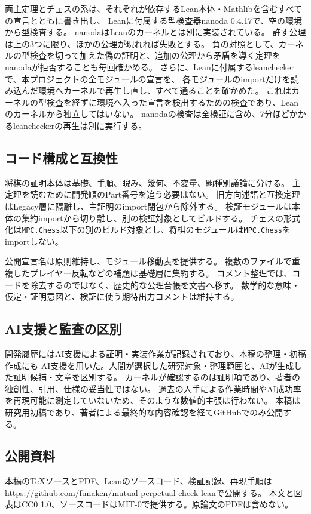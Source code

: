 \documentclass[a4paper,11pt]{article}
\newcommand{\code}[1]{{\small\nolinkurl{#1}}}
\theoremstyle{definition}
\begin{document}
両主定理とチェスの系は、それぞれが依存するLean本体・Mathlibを含むすべての宣言とともに書き出し、
Leanに付属する型検査器nanoda 0.4.17で、空の環境から型検査する。
nanodaはLeanのカーネルとは別に実装されている。
許す公理は上の3つに限り、ほかの公理が現れれば失敗とする。
負の対照として、カーネルの型検査を切って加えた偽の証明と、追加の公理から矛盾を導く定理を
nanodaが拒否することも毎回確かめる。
さらに、Leanに付属するleancheckerで、本プロジェクトの全モジュールの宣言を、
各モジュールのimportだけを読み込んだ環境へカーネルで再生し直し、すべて通ることを確かめた。
これはカーネルの型検査を経ずに環境へ入った宣言を検出するための検査であり、Leanのカーネルから独立してはいない。
nanodaの検査は全検証に含め、7分ほどかかるleancheckerの再生は別に実行する。


\subsection{コード構成と互換性}
将棋の証明本体は基礎、手順、睨み、幾何、不変量、駒種別議論に分ける。
主定理を読むために開発順のPart番号を追う必要はない。
旧方向述語と互換定理はLegacy層に隔離し、主証明のimport閉包から除外する。
検証モジュールは本体の集約importから切り離し、別の検証対象としてビルドする。
チェスの形式化は\code{MPC.Chess}以下の別のビルド対象とし、将棋のモジュールは\code{MPC.Chess}をimportしない。

公開宣言名は原則維持し、モジュール移動表を提供する。
複数のファイルで重複したプレイヤー反転などの補題は基礎層に集約する。
コメント整理では、コードを除去するのではなく、歴史的な公理台帳を文書へ移す。
数学的な意味・仮定・証明意図と、検証に使う期待出力コメントは維持する。

\subsection{AI支援と監査の区別}
開発履歴にはAI支援による証明・実装作業が記録されており、本稿の整理・初稿作成にも
AI支援を用いた。人間が選択した研究対象・整理範囲と、AIが生成した証明候補・文章を区別する。
カーネルが確認するのは証明項であり、著者の独創性、引用、仕様の妥当性ではない。
過去の人手による作業時間やAI成功率を再現可能に測定していないため、そのような数値的主張は行わない。
本稿は研究用初稿であり、著者による最終的な内容確認を経てGitHubでのみ公開する。

\subsection{公開資料}
本稿のTeXソースとPDF、Leanのソースコード、検証記録、再現手順は
\url{https://github.com/funaken/mutual-perpetual-check-lean}で公開する。
本文と図表はCC0 1.0、ソースコードはMIT-0で提供する。原論文のPDFは含めない。
\end{document}
